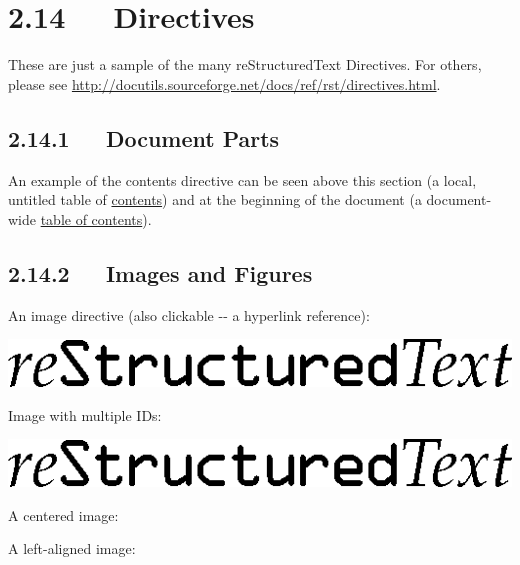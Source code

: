 \documentclass[a4paper]{memoir}
\begin{document}
\section{2.14   Directives%
  \label{directives}%
}

\label{contents}
These are just a sample of the many reStructuredText Directives.  For
others, please see
\url{http://docutils.sourceforge.net/docs/ref/rst/directives.html}.


\subsection{2.14.1   Document Parts%
  \label{document-parts}%
}

An example of the \textquotedbl{}contents\textquotedbl{} directive can be seen above this section
(a local, untitled table of \hyperref[contents]{contents}) and at the beginning of the
document (a document-wide \hyperref[table-of-contents]{table of contents}).


\subsection{2.14.2   Images and Figures%
  \label{images-and-figures}%
}

An image directive (also clickable -{}- a hyperlink reference):

\hyperref[directives]{\includegraphics{../../../docs/user/rst/images/title.png}}

Image with multiple IDs:

\includegraphics{../../../docs/user/rst/images/title.png}
\label{image-target-3}\label{image-target-2}\label{image-target-1}

A centered image:

\noindent{}

A left-aligned image:

\end{document}
